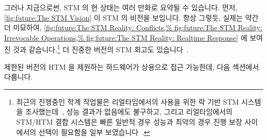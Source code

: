 그러나 지금으로썬, STM 의 현 상태는 여러 만화로 요약될 수 있습니다.
먼저,
\cref{fig:future:The STM Vision}
이 STM 의 비전을 보입니다.
항상 그렇듯, 실제는 약간 더 미묘하여,
\cref{fig:future:The STM Reality: Conflicts,%
fig:future:The STM Reality: Irrevocable Operations,%
fig:future:The STM Reality: Realtime Response} 에 보여진 것과
같습니다.\footnote{
	최근의 진행중인 학계 작업물은 리얼타임에서의 사용을 위한 락 기반 STM
	시스템을
	조사했는데~\cite{JimAnderson2019STMRT,CatherineNemitz2018LockSTMrealtime},
	성능 결과가 없음에도 불구하고, 그리고 리얼타임에서의 STM/HTM 결합
	시스템은 빠른 일반적 경우 성능과 최악의 경우 진행 보장 사이에서의
	선택이 필요함을 일부
	보였습니다~\cite{DBLP:journals/corr/AlistarhKKRS14,MartinSchoeberl2010realtimeTM}.}
더 진중한 버전의 STM 회고도
있습니다~\cite{JoeDuffy2010RetroTM,JoeDuffy2010RetroTM2}.

제한된 버전의 HTM 을 제원하는 하드웨어가 상용으로 접근 가능한데, 다음 섹션에서
다룹니다.

